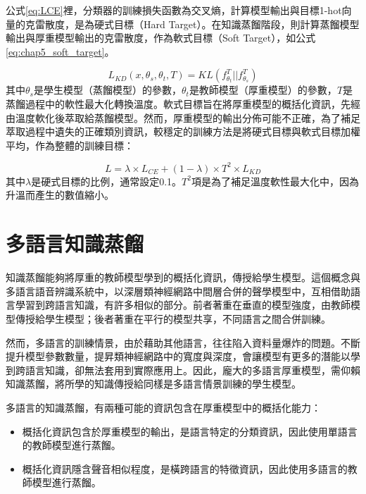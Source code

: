 公式\ref{eq:LCE}裡，分類器的訓練損失函數為交叉熵，計算模型輸出與目標1-hot向量的克雷散度，是為硬式目標（Hard Target）。在知識蒸餾階段，則計算蒸餾模型輸出與厚重模型輸出的克雷散度，作為軟式目標（Soft Target），如公式\ref{eq:chap5_soft_target}。

\begin{equation} \label{eq:chap5_soft_target}
L_{KD}(x, \theta_{s} , \theta_{t} , T ) = KL( f_{\theta_{t} }^{T} || f_{\theta_{s}}^{T} )
\end{equation}
其中$\theta_{s}$是學生模型（蒸餾模型）的參數，$\theta_{t}$是教師模型（厚重模型）的參數，$T$是蒸餾過程中的軟性最大化轉換溫度。軟式目標旨在將厚重模型的概括化資訊，先經由溫度軟化後萃取給蒸餾模型。然而，厚重模型的輸出分佈可能不正確，為了補足萃取過程中遺失的正確類別資訊，較穩定的訓練方法是將硬式目標與軟式目標加權平均，作為整體的訓練目標：

\begin{equation}
L = \lambda \times L_{CE} + (1-\lambda) \times T^2 \times L_{KD}
\end{equation}
其中$\lambda$是硬式目標的比例，通常設定0.1。$T^2$項是為了補足溫度軟性最大化中，因為升溫而產生的數值縮小。

\section{多語言知識蒸餾}
知識蒸餾能夠將厚重的教師模型學到的概括化資訊，傳授給學生模型。這個概念與多語言語音辨識系統中，以深層類神經網路中間層合併的聲學模型中，互相借助語言學習到跨語言知識，有許多相似的部分。前者著重在垂直的模型強度，由教師模型傳授給學生模型；後者著重在平行的模型共享，不同語言之間合併訓練。

然而，多語言的訓練情景，由於藉助其他語言，往往陷入資料量爆炸的問題。不斷提升模型參數數量，提昇類神經網路中的寬度與深度，會讓模型有更多的潛能以學到跨語言知識，卻無法套用到實際應用上。因此，龐大的多語言厚重模型，需仰賴知識蒸餾，將所學的知識傳授給同樣是多語言情景訓練的學生模型。

多語言的知識蒸餾，有兩種可能的資訊包含在厚重模型中的概括化能力：
\begin{itemize}
 \itemsep -2pt
 \item 概括化資訊包含於厚重模型的輸出，是語言特定的分類資訊，因此使用單語言的教師模型進行蒸餾。
 \item 概括化資訊隱含聲音相似程度，是橫跨語言的特徵資訊，因此使用多語言的教師模型進行蒸餾。
\end{itemize}

